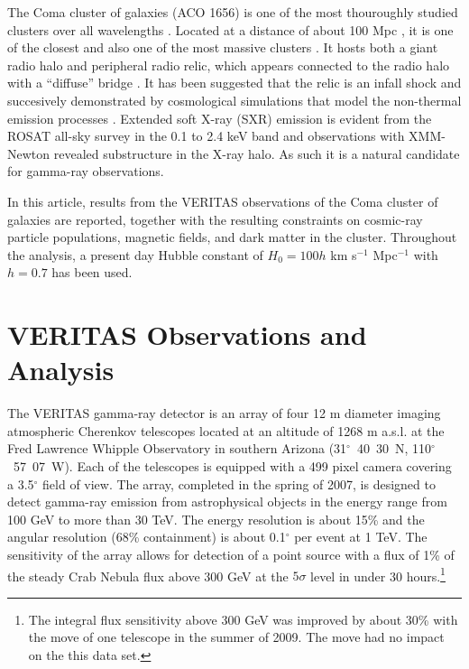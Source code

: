 \documentclass[12pt,manuscript]{aastex}
\begin{document}
The Coma cluster of galaxies (ACO 1656) is one of the most thouroughly studied clusters over all wavelengths \citep{article:Voges_etal:1999}. Located at a distance of about 100 Mpc \citep[$z=0.023$;][]{article:StrubleRood:1999}, it is one of the closest and also one of the most massive clusters \citep[$M \sim 10^{15}M_{\odot}$;][]{article:Smith:1983, article:Kubo_etal:2008}. It hosts both a giant radio halo \citep{article:Giovannini_etal:1993,article:Thierbach_etal:2003} and peripheral radio relic, which appears connected to the radio halo with a ``diffuse'' bridge \citep[see discussion in][]{article:BrownRudnick:2010}. It has been suggested that the relic is an infall shock \citep{article:Ensslin_etal:1998} and succesively demonstrated by cosmological simulations that model the non-thermal emission processes \citep{article:PfrommerEnsslinSpringel:2008, article:Pfrommer:2008, article:Battaglia_etal:2009, article:Skillman_etal:2011}. Extended soft X-ray (SXR) emission is evident from the ROSAT all-sky survey in the 0.1 to 2.4 keV band \citep{article:BrielHenryBohringer:1992} and observations with XMM-Newton \citep{article:Briel_etal:2001} revealed substructure in the X-ray halo. As such it is a natural candidate for gamma-ray observations. 

In this article, results from the VERITAS observations of the Coma cluster of galaxies are reported, 
together with the resulting constraints on cosmic-ray particle populations, magnetic fields, and dark matter in the cluster. Throughout the analysis, a present day Hubble constant of $H_{0} = 100h$ km s$^{-1}$ Mpc$^{-1}$ with $h=0.7$ has been used.

\section{VERITAS Observations and Analysis}
The VERITAS gamma-ray detector \citep{article:Weekes_etal:2002} is an array of four 12 m diameter imaging atmospheric Cherenkov telescopes \citep[IACTs;][]{article:Holder_etal:2006} located at an altitude of 1268 m a.s.l. at the Fred Lawrence Whipple Observatory in southern Arizona (31$^{\circ}$~40\arcmin~30\arcsec~N, 110$^{\circ}$~57\arcmin~07\arcsec~W). Each of the telescopes is equipped with a 499 pixel camera covering a 3.5$^{\circ}$ field of view. The array, completed in the spring of 2007, is designed to detect gamma-ray emission from astrophysical objects in the energy range from 100 GeV to more than 30 TeV. The energy resolution is about 15\% and the angular resolution (68\% containment) is about 0.1$^{\circ}$ per event at 1 TeV. The sensitivity of the array allows for detection of a point source with a flux of 1\% of the steady Crab Nebula flux above 300 GeV at the $5\sigma$ level in under 30 hours.\footnote{The integral flux sensitivity above 300 GeV was improved by about 30\% with the move of one telescope in the summer of 2009. The move had no impact on the this data set.}
\end{document}
